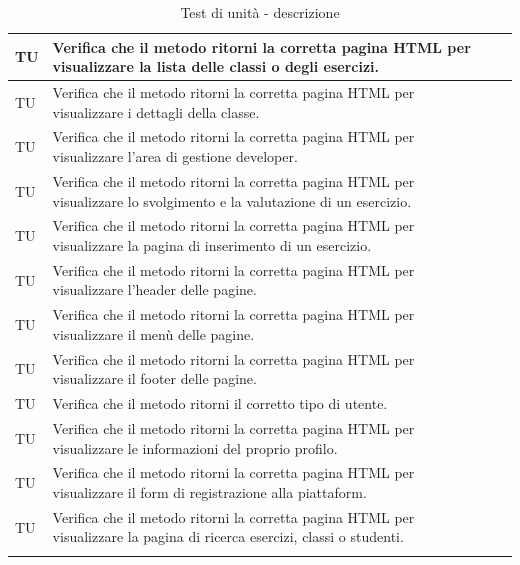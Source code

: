 \begin{longtable}{|>{\centering\arraybackslash}m{1.6cm}|>{\centering\arraybackslash}m{6.41cm}|>{\centering\arraybackslash}m{3.1cm}| c |}
		TU & Verifica che il metodo ritorni la corretta pagina HTML per visualizzare la lista delle classi o degli esercizi. \\ \hline
		TU & Verifica che il metodo ritorni la corretta pagina HTML per visualizzare i dettagli della classe. \\ \hline
		TU & Verifica che il metodo ritorni la corretta pagina HTML per visualizzare l'area di gestione developer. \\ \hline
		TU & Verifica che il metodo ritorni la corretta pagina HTML per visualizzare lo svolgimento e la valutazione di un esercizio. \\ \hline
		TU & Verifica che il metodo ritorni la corretta pagina HTML per visualizzare la pagina di inserimento di un esercizio. \\ \hline
		TU & Verifica che il metodo ritorni la corretta pagina HTML per visualizzare l'header delle pagine. \\ \hline
		TU & Verifica che il metodo ritorni la corretta pagina HTML per visualizzare il menù delle pagine. \\ \hline
		TU & Verifica che il metodo ritorni la corretta pagina HTML per visualizzare il footer delle pagine. \\ \hline
		TU & Verifica che il metodo ritorni il corretto tipo di utente. \\ \hline
		TU & Verifica che il metodo ritorni la corretta pagina HTML per visualizzare le informazioni del proprio profilo. \\ \hline
		TU & Verifica che il metodo ritorni la corretta pagina HTML per visualizzare il form di registrazione alla piattaform. \\ \hline
		TU & Verifica che il metodo ritorni la corretta pagina HTML per visualizzare la pagina di ricerca esercizi, classi o studenti. \\ \hline
		
		\caption{Test di unità - descrizione}
\end{longtable}

